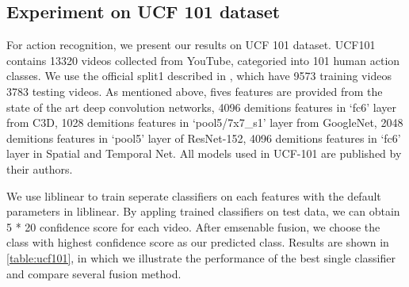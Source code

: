 \documentclass[letterpaper]{article}
\begin{document}

\subsection{Experiment on UCF 101 dataset}
For action recognition, we present our results on UCF 101 dataset\cite{soomro2012ucf101}. UCF101 contains 13320 videos collected from YouTube, categoried into 101 human action classes. We use the official split1 described in \cite{soomro2012ucf101}, which have 9573 training videos 3783 testing videos. As mentioned above, fives features are provided from the state of the art deep convolution networks, 4096 demitions features in `fc6' layer from C3D, 1028 demitions features in `pool5/7x7\_s1' layer from  GoogleNet, 2048 demitions features in `pool5' layer of ResNet-152, 4096 demitions features in `fc6' layer in Spatial and Temporal Net. All models used in UCF-101 are published by their authors.

We use liblinear to train seperate classifiers on each features with the default parameters in liblinear. By appling trained classifiers on test data, we can obtain 5 * 20 confidence score for each video. After emsenable fusion, we choose the class with highest confidence score as our predicted class. Results are shown in \ref{table:ucf101}, in which we illustrate the performance of the best single classifier and compare several fusion method.
\end{document}
